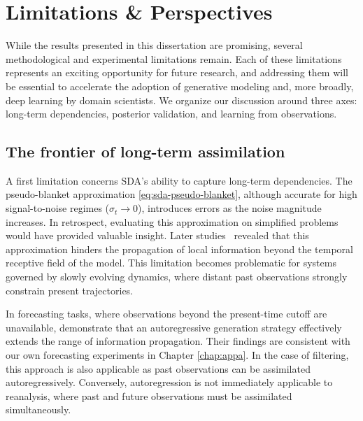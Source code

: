 \vspace{-1ex}
\section{Limitations \& Perspectives}

While the results presented in this dissertation are promising, several methodological and experimental limitations remain. Each of these limitations represents an exciting opportunity for future research, and addressing them will be essential to accelerate the adoption of generative modeling and, more broadly, deep learning by domain scientists. We organize our discussion around three axes: long-term dependencies, posterior validation, and learning from observations.

\vspace{-1ex}
\subsection*{The frontier of long-term assimilation}

A first limitation concerns SDA's ability to capture long-term dependencies. The pseudo-blanket approximation \eqref{eq:sda-pseudo-blanket}, although accurate for high signal-to-noise regimes ($\sigma_t \to 0$), introduces errors as the noise magnitude increases. In retrospect, evaluating this approximation on simplified problems would have provided valuable insight. Later studies~\cite{shysheya2024conditional} revealed that this approximation hinders the propagation of local information beyond the temporal receptive field of the model. This limitation becomes problematic for systems governed by slowly evolving dynamics, where distant past observations strongly constrain present trajectories.

In forecasting tasks, where observations beyond the present-time cutoff are unavailable, \textcite{shysheya2024conditional} demonstrate that an autoregressive generation strategy effectively extends the range of information propagation. Their findings are consistent with our own forecasting experiments in Chapter \ref{chap:appa}. In the case of filtering, this approach is also applicable as past observations can be assimilated autoregressively. Conversely, autoregression is not immediately applicable to reanalysis, where past and future observations must be assimilated simultaneously.

